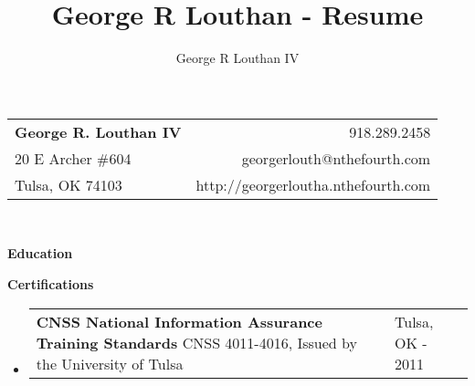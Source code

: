 \documentclass[letterpaper,11pt]{article}
\title{George R Louthan - Resume}
\author{George R Louthan IV}
\makeatletter
\newcommand{\resheading}[1]{{\large \colorbox{mygrey}{\begin{minipage}
    {\textwidth}{\textbf{#1 \vphantom{p\^{E}}}}\end{minipage}}}}
\newcommand{\resentry}[3][0pt]{
    \begin{tabular*}{0.9\textwidth}[t]{@{\hspace{#1}}p{5.0in-#1}@{\extracolsep{\fill}}p{0.75in}}
        #2 & #3
        \tabularnewline
    \end{tabular*}
}
\newcommand{\ressubheading}[4]{
    \resentry{\textbf{#1} \newline #3}{#2 \newline #4}    
}
\newcommand{\resschool}[3]{
    \resentry{\textbf{#1} \newline #3}{#2}
}
\newcommand{\resdegree}[3]{
    \resentry[10pt]{
\setlength{\parskip}{1ex plus 0.5ex minus 0.2ex} #1 #2}{#3}
}
\newcommand{\resdegreeextra}[4]{
    \resentry[10pt]{
\setlength{\parskip}{1ex plus 0.5ex minus 0.2ex} #1 #2 \newline \textit{#4}}{#3}
}
\makeatother
\begin{document}
\begin{tabular*}{7in}{l@{\extracolsep{\fill}}r}
\textbf{\Large George R. Louthan IV}  & 918.289.2458\\
20 E Archer \#604 &  georgerlouth@nthefourth.com \\
Tulsa, OK 74103 & http://georgerloutha.nthefourth.com \\
\end{tabular*}
\\

\vspace{0.1in}

\resheading{Education}
\resheading{Certifications}
\begin{itemize}
\item
	\ressubheading{CNSS National Information Assurance Training Standards}
        {Tulsa, OK}{CNSS 4011-4016, Issued by the University of
        Tulsa}{2006 - 2011}
\end{itemize}
\end{document}

